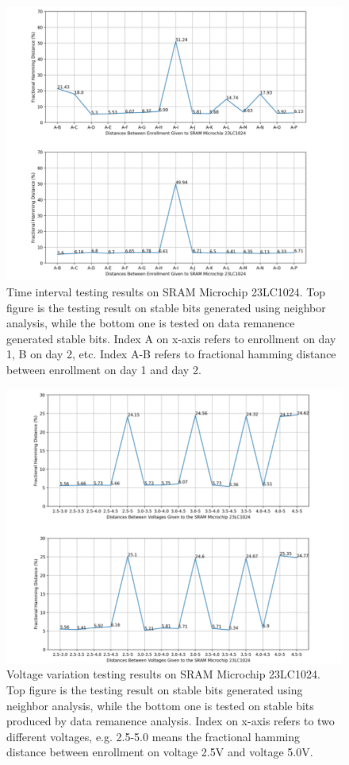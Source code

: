 \begin{figure}[tph!]
    \centerline{\includegraphics[width={1.2\textwidth}]{images/23lc1024_hd_intra_time_stable}}
    \caption{Time interval testing results on SRAM Microchip 23LC1024. Top figure is the testing result on stable bits generated using neighbor analysis, while the bottom one is tested on data remanence generated stable bits. Index A on x-axis refers to enrollment on day 1, B on day 2, etc. Index A-B refers to fractional hamming distance between enrollment on day 1 and day 2.}
    \label{fig:test_stable_23lc1024}
\end{figure}

\begin{figure}[tph!]
    \centerline{\includegraphics[width={1.2\textwidth}]{images/23lc1024_hd_intra_voltage_stable}}
    \caption{Voltage variation testing results on SRAM Microchip 23LC1024. Top figure is the testing result on stable bits generated using neighbor analysis, while the bottom one is tested on stable bits produced by data remanence analysis. Index on x-axis refers to two different voltages, e.g. 2.5-5.0 means the fractional hamming distance between enrollment on voltage 2.5V and voltage 5.0V.}
    \label{fig:test_stable_23lc1024_voltage}
\end{figure}

